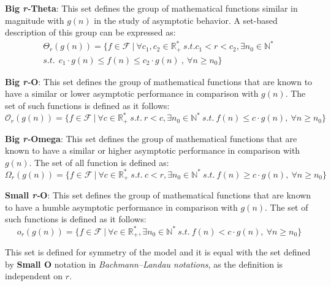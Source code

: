 \begin{definition} \textbf{Big \textit{r-}Theta}: This set defines the group of mathematical functions similar in magnitude with  $g(n)$ in the study of asymptotic behavior. A set-based description of this group can be expressed as:
  \[\begin{split} \Theta_{r}(g(n)) = \lbrace f \in \mathcal{F}\ |\ \forall c_{1}, c_{2} \in \mathbb{R}^{*}_{+} \ s.t.  c_{1}< r < c_{2} , \exists n_{0} \in \mathbb{N}^{*}\ \\ s.t.\ \ c_{1} \cdot g(n) \leq f(n) \leq c_{2} \cdot g(n)\ ,\  \forall n \geq n_{0} \rbrace \end{split} \]
\end{definition} 

\begin{definition} \textbf{Big \textit{r-}O}: This set defines the group of mathematical functions that are known to have a similar or lower
 asymptotic performance in comparison with  $g(n)$. The set of such functions is defined as it follows:
  \[\mathcal{O}_{r}(g(n)) = \lbrace f \in \mathcal{F}\ |\ \forall c  \in \mathbb{R}^{*}_{+} \ s.t.\  r<c, \exists n_{0} \in \mathbb{N}^{*}\ s.t.\  f(n) \leq c \cdot g(n),\  \forall n \geq n_{0} \rbrace\]
\end{definition}

\begin{definition} \textbf{Big \textit{r-}Omega}: This set defines the group of mathematical functions that are known to have a similar or higher asymptotic performance in comparison with  $g(n)$. The set of all function is defined as:
    \[\Omega_{r}(g(n)) = \lbrace f \in \mathcal{F}\ |\ \forall c  \in \mathbb{R}^{*}_{+}\ s.t. \ c < r, \exists n_{0} \in \mathbb{N}^{*}\ s.t.\  f(n) \geq c \cdot g(n),\  \forall n \geq n_{0} \rbrace\]
\end{definition}

\begin{definition} \textbf{Small \textit{r-}O}:
  This set defines the group of mathematical functions that are known to have a humble
 asymptotic performance in comparison with  $g(n)$. The set of such functions is defined as it follows:
  \[o_{r}(g(n)) = \lbrace f \in \mathcal{F}\ |\ \forall c \in \mathbb{R}^{*}_{+}, \exists n_{0} \in \mathbb{N}^{*}\ s.t.\  f(n) < c \cdot g(n),\  \forall n \geq n_{0} \rbrace\]
\end{definition}
\begin{remark}
  This set is defined for symmetry of the model and it is equal with the set defined by \textbf{Small O} notation in \textit{Bachmann–Landau notations}, as the definition is independent on $r$.
\end{remark}

